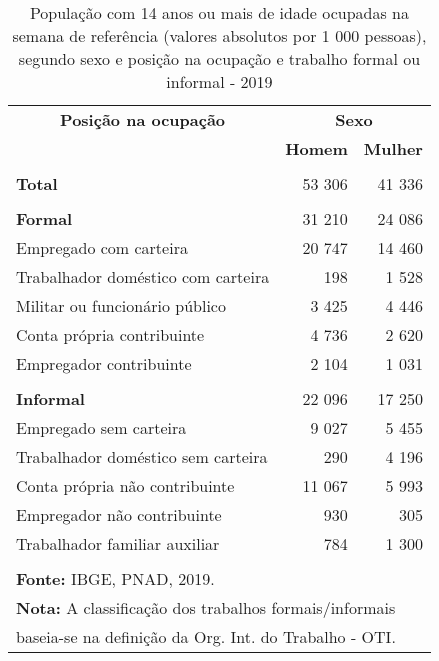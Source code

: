 \documentclass[12pt]{article}   %
\begin{document}
	\begin{table}[h!]
		\centering
		\caption{População com 14 anos ou mais de idade ocupadas na semana de referência (valores absolutos por 1 000 pessoas), segundo sexo e posição na ocupação e trabalho formal ou informal - 2019}
		\label{tab_ocupteen}
		\begin{tabular}{l|rr}
			\hline
			\multicolumn{1}{c|}{\textbf{Posição na ocupação}}&\multicolumn{2}{c}{\textbf{Sexo}}\\
			&\textbf{Homem}&\textbf{Mulher}\\
			\hline
			&&\\
			\textbf{Total}&53 306&41 336\\
			&&\\
			\textbf{Formal}&31 210&24 086\\
			Empregado com carteira&20 747&14 460\\
			Trabalhador doméstico com carteira&198&1 528\\
			Militar ou funcionário público&3 425& 4 446\\
			Conta própria contribuinte&4 736&2 620\\
			Empregador contribuinte&2 104&1 031\\
			&&\\
			\textbf{Informal}&22 096&17 250\\
			Empregado sem carteira&9 027&5 455\\
			Trabalhador doméstico sem carteira&290&4 196\\
			Conta própria não contribuinte&11 067&5 993\\
			Empregador não contribuinte&930&305\\
			Trabalhador familiar auxiliar&784&1 300\\
			&&\\
			\hline
			\multicolumn{3}{l}{\textbf{Fonte:} IBGE, PNAD, 2019.}\\
			\multicolumn{3}{l}{\textbf{Nota:} A classificação dos trabalhos formais/informais}\\
			\multicolumn{3}{l}{baseia-se na definição da Org. Int. do Trabalho - OTI.}
		\end{tabular}
	\end{table}
\end{document}
